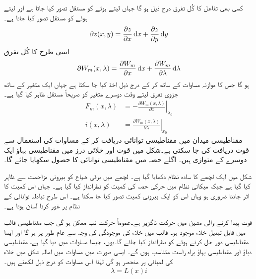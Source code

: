 کسی بھی تفاعل  کا کُل تفرق درج ذیل ہو گا جہاں  لیتے ہوئے  کو مستقل تصور کیا جاتا ہے اور  لیتے ہوئے  کو مستقل تصور کیا جاتا ہے۔
\begin{align}\label{مساوات_تبادلہ_جزوی_تفرق_عمومی_الف}
\partial z(x,y)=\frac{\partial z}{\partial x} \dif x+\frac{\partial z}{\partial y} \dif y
\end{align}
اسی طرح  کا کُل تفرق
\begin{align}\label{مساوات_تبادلہ_جزوی_تفرق_عمومی_ب}
\partial W_m(x,\lambda)=\frac{\partial W_m}{\partial x}\dif x+\frac{\partial W_m}{\partial \lambda}\dif \lambda
\end{align}
ہو گا جس کا موازنہ مساوات  کے ساتھ کر کے درج ذیل اخذ  کیا جا سکتا ہے جہاں ایک متغیر کے ساتھ جزوی تفرق لیتے وقت دوسرے متغیر  کو صریحاً مستقل ظاہر کیا گیا ہے۔
\begin{align}
F_m(x,\lambda)&=-\left. \frac{\partial W_m(x,\lambda)}{\partial x}\right|_{\lambda_0}\label{مساوات_تبادلہ_توانائی_قوت_برقی_رو}\\
i(x,\lambda)&=\left. \frac{\partial W_m(x,\lambda)}{\partial \lambda}\right|_{x_0}\label{مساوات_تبادلہ_توانائی_سے_رو}
\end{align}
مقناطیسی میدان میں مقناطیسی توانائی  دریافت کر کے مساوات   کی  استعمال سے قوت  دریافت کی جا سکتی ہے۔شکل  میں قوت اور خلائی درز میں مقناطیسی بہاؤ ایک دوسرے کے متوازی ہیں۔ اگلے حصہ میں مقناطیسی توانائی کا حصول سکھایا جائے گا۔

شکل   میں  ایک لچھے کا سادہ نظام دکھایا گیا ہے۔ لچھے میں برقی ضیاع کو بیرونی مزاحمت سے ظاہر کیا گیا ہے جبکہ میکانی نظام میں حرکی حصہ کی کمیت کو نظرانداز کیا گیا ہے۔ جہاں اس کمیت  کا اثر جاننا ضروری ہو وہاں  اس کو ایک بیرونی کمیت تصور کیا جا سکتا ہے۔ اس طرح تبادلہ توانائی کے نظام پر غور کرنا آسان ہوتا ہے۔ 

قوت پیدا کرنے والی مشین میں حرکت ناگزیر ہے۔عموماً حرکت تب ممکن ہو گی جب مقناطیسی قالب میں قابل تبدیل خلاء موجود ہو۔ قالب میں خلاء کی موجودگی کی وجہ سے  عام طور  پر  ہو گا اور ایسا  مقناطیسی دور حل کرتے ہوئے  کو نظرانداز کیا جائے گا۔یوں، جیسا مساوات   میں دیا گیا ہے،  مقناطیسی دباؤ  اور مقناطیسی بہاؤ   براہ راست متناسب ہوں گے۔ ایسی صورت میں مساوات   میں  امالہ  شکل    میں خلاء کی لمبائی   پر منحصر ہو گی لہٰذا اس مساوات کو درج ذیل لکھتے ہیں۔
\begin{align}\label{مساوات_تبادلہ_ارتباط_بہاو_اور_امالہ}
\lambda=L(x) i
\end{align}

